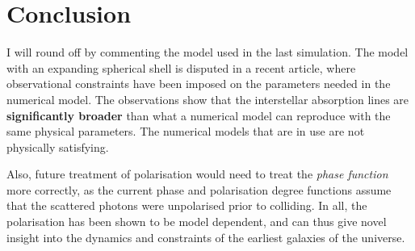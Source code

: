 \documentclass[ignorenonframetext]{beamer}
\begin{document}
\section{Conclusion}
I will round off by commenting the model used in the last simulation. The model with an expanding spherical shell is disputed in a recent article, where observational constraints have been imposed on the parameters needed in the numerical model. The observations show that the interstellar absorption lines are \textbf{significantly broader} than what a numerical model can reproduce with the same physical parameters. The numerical models that are in use are not physically satisfying. 

Also, future treatment of polarisation would need to treat the \textit{phase function} more correctly, as the current phase and polarisation degree functions assume that the scattered photons were unpolarised prior to colliding. 
In all, the polarisation has been shown to be model dependent, and can thus give novel insight into the dynamics and constraints of the earliest galaxies of the universe.


\begin{frame}



%
%

    
\end{frame}
\end{document}
